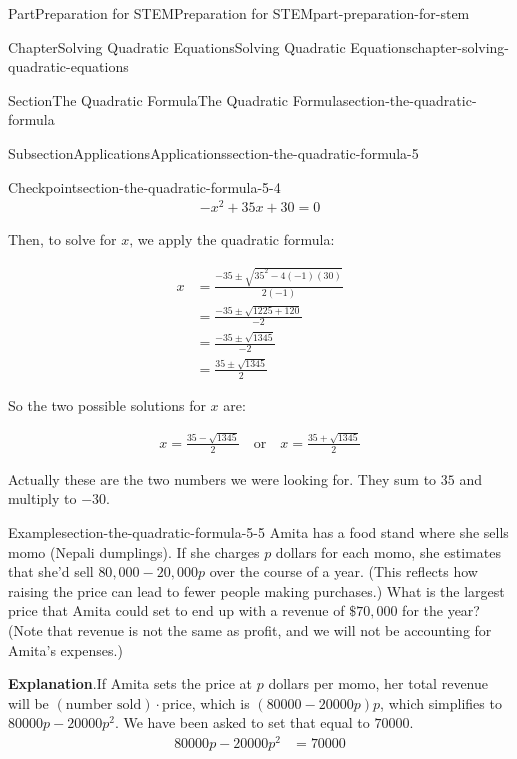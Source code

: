 \documentclass[twoside,10pt,]{book}
\newcommand{\blocktitlefont}{\relax}
\numberwithin{equation}{section}
\newcommand{\amp}{&}
\begin{document}
\begin{partptx}{Part}{Preparation for STEM}{}{Preparation for STEM}{}{}{part-preparation-for-stem}
\begin{chapterptx}{Chapter}{Solving Quadratic Equations}{}{Solving Quadratic Equations}{}{}{chapter-solving-quadratic-equations}
\begin{sectionptx}{Section}{The Quadratic Formula}{}{The Quadratic Formula}{}{}{section-the-quadratic-formula}
\begin{subsectionptx}{Subsection}{Applications}{}{Applications}{}{}{section-the-quadratic-formula-5}
\begin{inlineexercise}{Checkpoint}{}{section-the-quadratic-formula-5-4}
\begin{equation*}
\begin{gathered}
-x^2+35x+30=0
\end{gathered}
\end{equation*}
%
\par
Then, to solve for \(x\text{,}\) we apply the quadratic formula:%
\par
%
\begin{equation*}
\begin{aligned}
x\amp=\frac{-35\pm\sqrt{35^2-4(-1)(30)}}{2(-1)}\\
\amp=\frac{-35\pm\sqrt{1225+120}}{-2}\\
\amp=\frac{-35\pm\sqrt{1345}}{-2}\\
\amp=\frac{35\pm\sqrt{1345}}{2}
\end{aligned}
\end{equation*}
%
\par
So the two possible solutions for \(x\) are:%
\par
%
\begin{equation*}
\begin{gathered}
x=\frac{35-\sqrt{1345}}{2}\quad\text{or}\quad x=\frac{35+\sqrt{1345}}{2}
\end{gathered}
\end{equation*}
%
\par
Actually these are the two numbers we were looking for. They sum to \(35\) and multiply to \(-30\text{.}\)%
\end{inlineexercise}%
\begin{example}{Example}{}{section-the-quadratic-formula-5-5}%
Amita has a food stand where she sells momo (Nepali dumplings). If she charges \(p\) dollars for each momo, she estimates that she'd sell \(80{,}000-20{,}000p\) over the course of a year. (This reflects how raising the price can lead to fewer people making purchases.) What is the largest price that Amita could set to end up with a revenue of \(\$70{,}000\) for the year? (Note that revenue is not the same as profit, and we will not be accounting for Amita's expenses.)%
\par
%
\par\smallskip%
{\makeatletter{}\makeatother\noindent\textbf{\blocktitlefont Explanation}.\hypertarget{section-the-quadratic-formula-5-5-2}{}\quad{}If Amita sets the price at \(p\) dollars per momo, her total revenue will be \((\text{number sold})\cdot\text{price}\), which is \((80000-20000p)p\), which simplifies to \(80000p-20000p^2\). We have been asked to set that equal to \(70000\).%
\begin{align*}
80000p-20000p^2 \amp = 70000\\

\end{align*}}
\end{example}
\end{subsectionptx}
\end{sectionptx}
\end{chapterptx}
\end{partptx}
\end{document}
